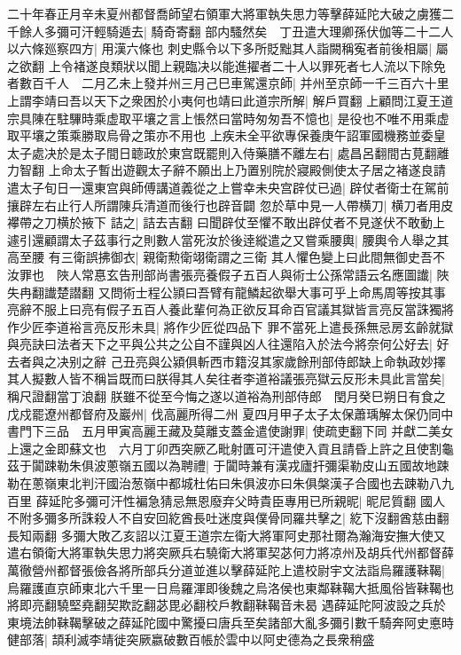 二十年春正月辛未夏州都督喬師望右領軍大將軍執失思力等擊薛延陀大破之虜獲二千餘人多彌可汗輕騎遁去|{
	騎奇寄翻}
部内騷然矣　丁丑遣大理卿孫伏伽等二十二人以六條廵察四方|{
	用漢六條也}
刺史縣令以下多所貶黜其人詣闕稱寃者前後相屬|{
	屬之欲翻}
上令褚遂良類狀以聞上親臨决以能進擢者二十人以罪死者七人流以下除免者數百千人　二月乙未上發并州三月己巳車駕還京師|{
	并州至京師一千三百六十里}
上謂李靖曰吾以天下之衆困於小夷何也靖曰此道宗所解|{
	解戶買翻}
上顧問江夏王道宗具陳在駐驆時乘虚取平壤之言上悵然曰當時匆匆吾不憶也|{
	是役也不唯不用乘虚取平壤之策乘勝取烏骨之策亦不用也}
上疾未全平欲專保養庚午詔軍國機務並委皇太子處决於是太子間日聼政於東宫既罷則入侍藥膳不離左右|{
	處昌呂翻間古莧翻離力智翻}
上命太子暫出遊觀太子辭不願出上乃置别院於寢殿側使太子居之褚遂良請遣太子旬日一還東宫與師傅講道義從之上嘗幸未央宫辟仗已過|{
	辟仗者衛士在駕前攘辟左右止行人所謂陳兵清道而後行也辟音闢}
忽於草中見一人帶横刀|{
	横刀者用皮襻帶之刀横於掖下}
詰之|{
	詰去吉翻}
曰聞辟仗至懼不敢出辟仗者不見遂伏不敢動上遽引還顧謂太子茲事行之則數人當死汝於後逹縱遣之又嘗乘腰輿|{
	腰輿令人舉之其高至腰}
有三衛誤拂御衣|{
	親衛勲衛翊衛謂之三衛}
其人懼色變上曰此間無御史吾不汝罪也　陜人常惪玄告刑部尚書張亮養假子五百人與術士公孫常語云名應圖䜟|{
	陜失冉翻䜟楚譛翻}
又問術士程公頴曰吾臂有龍鱗起欲舉大事可乎上命馬周等按其事亮辭不服上曰亮有假子五百人養此輩何為正欲反耳命百官議其獄皆言亮反當誅獨將作少匠李道裕言亮反形未具|{
	將作少匠從四品下}
罪不當死上遣長孫無忌房玄齡就獄與亮訣曰法者天下之平與公共之公自不謹與凶人往還陷入於法今將奈何公好去|{
	好去者與之决别之辭}
己丑亮與公潁俱斬西市籍沒其家歲餘刑部侍郎缺上命執政妙擇其人擬數人皆不稱旨既而曰朕得其人矣往者李道裕議張亮獄云反形未具此言當矣|{
	稱尺證翻當丁浪翻}
朕雖不從至今悔之遂以道裕為刑部侍郎　閏月癸巳朔日有食之　戊戍罷遼州都督府及巖州|{
	伐高麗所得二州}
夏四月甲子太子太保蕭瑀解太保仍同中書門下三品　五月甲寅高麗王藏及莫離支蓋金遣使謝罪|{
	使疏吏翻下同}
并獻二美女上還之金即蘇文也　六月丁卯西突厥乙毗射匱可汗遣使入貢且請昏上許之且使割龜茲于闐踈勒朱俱波蔥嶺五國以為聘禮|{
	于闐時兼有漢戎廬扞彌渠勒皮山五國故地踈勒在蔥嶺東北判汗國治葱嶺中都城杜佑曰朱俱波亦曰朱俱槃漢子合國也去踈勒八九百里}
薛延陀多彌可汗性褊急猜忌無恩廢弃父時貴臣專用已所親昵|{
	昵尼質翻}
國人不附多彌多所誅殺人不自安回紇酋長吐迷度與僕骨同羅共擊之|{
	紇下沒翻酋慈由翻長知兩翻}
多彌大敗乙亥詔以江夏王道宗左衛大將軍阿史那社爾為瀚海安撫大使又遣右領衛大將軍執失思力將突厥兵右驍衛大將軍契苾何力將凉州及胡兵代州都督薛萬徹營州都督張儉各將所部兵分道並進以擊薛延陀上遣校尉宇文法詣烏羅護靺鞨|{
	烏羅護直京師東北六千里一日烏羅渾即後魏之烏洛侯也東鄰靺鞨大抵風俗皆靺鞨也將即亮翻驍堅堯翻契欺訖翻苾毘必翻校戶教翻靺鞨音未曷}
遇薛延陀阿波設之兵於東境法帥靺鞨擊破之薛延陀國中驚擾曰唐兵至矣諸部大亂多彌引數千騎奔阿史悳時健部落|{
	頡利滅李靖徙突厥嬴破數百帳於雲中以阿史德為之長衆稍盛}
